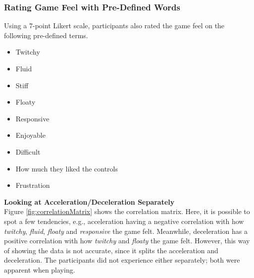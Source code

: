 \subsubsection{Rating Game Feel with Pre-Defined Words}
Using a 7-point Likert scale, participants also rated the game feel on the following pre-defined terms.
\begin{itemize}[noitemsep,nolistsep]
\item Twitchy
\item Fluid
\item Stiff
\item Floaty
\item Responsive
\item Enjoyable
\item Difficult
\item How much they liked the controls
\item Frustration
\end{itemize}

\textbf{Looking at Acceleration/Deceleration Separately}\\
Figure \ref{fig:correlationMatrix} shows the correlation matrix. Here, it is possible to spot a few tendencies, e.g., acceleration having a negative correlation with how \textit{twitchy}, \textit{fluid}, \textit{floaty} and \textit{responsive} the game felt. Meanwhile, deceleration has a positive correlation with how \textit{twitchy} and \textit{floaty} the game felt. However, this way of showing the data is not accurate, since it splits the acceleration and deceleration. The participants did not experience either separately; both were apparent when playing.



